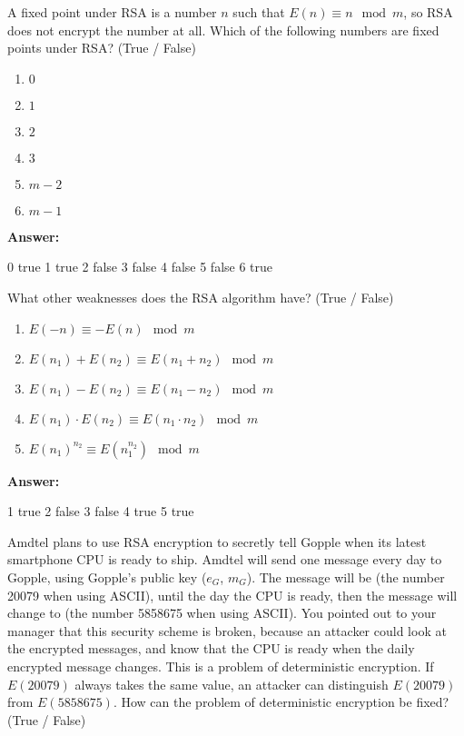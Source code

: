 \documentclass[12pt,twoside]{article}
\newcommand{\answer}{
 \par\medskip
 \textbf{Answer:}
}
\newcommand{\answerIId}{ \answer
0 true
1 true
2 false
3 false
4 false
5 false
6 true
}
\newcommand{\answerIIe}{ \answer
1 true
2 false
3 false
4 true
5 true
}
\begin{document}
\begin{problems}
\begin {problemparts}
\problempart {} A fixed point under RSA is a number $n$ such that $E(n)
\equiv n \mod m$, so RSA does not encrypt the number at all. Which of the
following numbers are fixed points under RSA? (True / False)
\begin{enumerate}
  \item $0$
  \item $1$
  \item $2$
  \item $3$
  \item $m - 2$
  \item $m - 1$
\end{enumerate}
\answerIId
  
\problempart {} What other weaknesses does the RSA algorithm have?
(True / False)
\begin{enumerate}
  \item $E(-n) \equiv -E(n) \mod m$
  \item $E(n_1) + E(n_2) \equiv E(n_1 + n_2) \mod m$
  \item $E(n_1) - E(n_2) \equiv E(n_1 - n_2) \mod m$
  \item $E(n_1) \cdot E(n_2) \equiv E(n_1 \cdot n_2) \mod m$
  \item $E(n_1)^{n_2} \equiv E(n_1 ^ {n_2}) \mod m$
\end{enumerate}
\answerIIe

\problempart {} Amdtel plans to use RSA encryption to secretly tell
Gopple when its latest smartphone CPU is ready to ship. Amdtel will send one
message every day to Gopple, using Gopple's public key ($e_G$, $m_G$). The
message will be  (the number 20079 when using ASCII), until the day
the CPU is ready, then the message will change to  (the number
5858675 when using ASCII). You pointed out to your manager that this security
scheme is broken, because an attacker could look at the encrypted messages, and
know that the CPU is ready when the daily encrypted message changes. This is a
problem of deterministic encryption. If $E(20079)$ always takes the same value,
an attacker can distinguish $E(20079)$ from $E(5858675)$. How can the problem of
deterministic encryption be fixed? (True / False)


\end{problemparts}
\end{problems}
\end{document}
